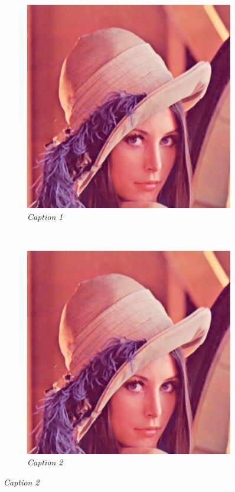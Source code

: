 \documentclass[11pt]{article}
\begin{document}
\begin{figure}[H]
    \centering
    \begin{subfigure}[t]{0.5\textwidth}
        \centering
		\includegraphics[scale=.4]{figures/lena.png}
        \caption{\emph{Caption 1 }}
    \end{subfigure}%
    ~
    \begin{subfigure}[t]{0.5\textwidth}
        \centering
        \includegraphics[scale=.4]{figures/lena.png}
		\caption{\emph{Caption 2}}
    \end{subfigure}%


\end{figure}
\end{document}
